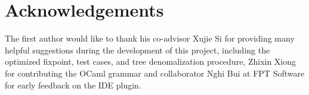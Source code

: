 \documentclass[sigplan,review,anonymous,acmsmall]{acmart}\settopmatter{printfolios=false,printccs=false,printacmref=false}
\begin{document}
    \section{Acknowledgements}
    The first author would like to thank his co-advisor Xujie Si for providing many helpful suggestions during the development of this project, including the optimized fixpoint, test cases, and tree denomalization procedure, Zhixin Xiong for contributing the OCaml grammar and collaborator Nghi Bui at FPT Software for early feedback on the IDE plugin.
    
\end{document}
